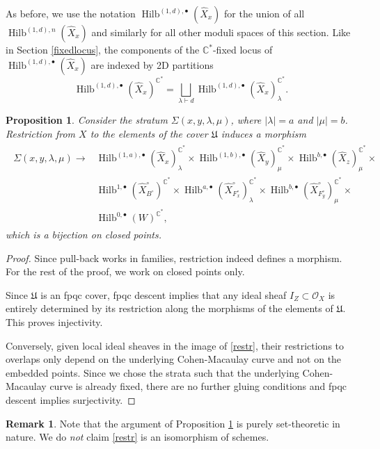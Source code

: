 \documentclass{amsart}
\newtheorem{proposition}[theorem]{Proposition}
\theoremstyle{definition}
\newtheorem{remark}[theorem]{Remark}
\newcommand{\CC} {\mathbb{C}}          %
\renewcommand{\O}{\mathcal{O}}
\newcommand{\Hilb}{\operatorname{Hilb}}
\newcommand{\Xhat}{\widehat{X}}
\begin{document}
As before, we use the notation $\Hilb^{(1,d),\bullet}(\Xhat _x)$ for the union of all $\Hilb^{(1,d),n}(\Xhat _x)$ and similarly for all other moduli spaces of this section. Like in Section \ref{fixedlocus}, the components of the $\CC^*$-fixed locus of $\Hilb^{(1,d),\bullet}(\Xhat _x)$ are indexed by 2D partitions 
$$
\Hilb^{(1,d),\bullet}(\Xhat _x)^{\CC^*} = \bigsqcup_{\lambda \vdash d} \Hilb^{(1,d),\bullet}(\Xhat _x)_{\lambda}^{\CC^*}.
$$

\begin{proposition} \label{bij}
Consider the stratum $\Sigma(x,y,\lambda,\mu)$, where $|\lambda|=a$ and $|\mu|=b$. Restriction from $X$ to the elements of the cover $\mathfrak{U}$ induces a morphism
\begin{align}
\begin{split} \label{restr}
\Sigma(x,y,\lambda,\mu) \longrightarrow &\Hilb^{(1,a),\bullet}(\Xhat _x)_{\lambda}^{\CC^*} \times \Hilb^{(1,b),\bullet}(\Xhat _y)_{\mu}^{\CC^*} \times \Hilb^{b,\bullet}(\Xhat _z)_{\mu}^{\CC^*} \times \\
&\Hilb^{1,\bullet}(\Xhat ^{\circ}_{B^\circ})^{\CC^*} \times \Hilb^{a,\bullet}(\Xhat ^{\circ}_{F_{x}^{\circ}})_{\lambda}^{\CC^*} \times \Hilb^{b,\bullet}(\Xhat ^{\circ}_{F_{y}^{\circ}})_{\mu}^{\CC^*} \times \\
&\Hilb^{0,\bullet}(W)^{\CC^*},
\end{split}
\end{align}
which is a bijection on closed points.
\end{proposition}
\begin{proof}
Since pull-back works in families, restriction indeed defines a morphism. For the rest of the proof, we work on closed points only.

Since $\mathfrak{U}$ is an fpqc cover, fpqc descent implies that any ideal sheaf $I_Z \subset \O_X$ is entirely determined by its restriction along the morphisms of the elements of $\mathfrak{U}$. This proves injectivity.

Conversely, given local ideal sheaves in the image of \eqref{restr}, their restrictions to overlaps only depend on the underlying Cohen-Macaulay curve and not on the embedded points. Since we chose the strata such that the underlying Cohen-Macaulay curve is already fixed, there are no further gluing conditions and fpqc descent implies surjectivity.
\end{proof}
   
\begin{remark}
Note that the argument of Proposition \ref{bij} is purely set-theoretic in nature. We do \emph{not} claim \eqref{restr} is an isomorphism of schemes. 
\end{remark}
\end{document}
